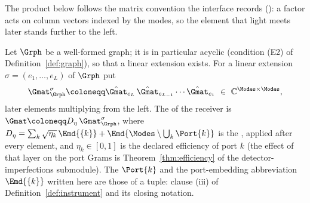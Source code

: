 
The product below follows the matrix convention the interface records
(): a factor acts on column
vectors indexed by the modes, so the element that light meets later stands
further to the left.

\begin{definition}\label{def:compile}
Let $\Grph$ be a well-formed graph; it is in particular acyclic
(condition (E2) of Definition~\ref{def:graph}), so that a linear extension exists. For a
linear extension $\sigma=(e_1,\dots,e_L)$ of $\Grph$ put
\begin{equation}\label{eq:compile}
  \Gmat_{\Grph}^{\sigma}\coloneqq
  \hat\Gmat_{e_L}\,\hat\Gmat_{e_{L-1}}\cdots\hat\Gmat_{e_1}
  \ \in\ \mathbb{C}^{\Modes\times\Modes},
\end{equation}
later elements multiplying from the left. The
 of the receiver is
$\Gmat\coloneqq D_\eta\,\Gmat^{\sigma}_{\Grph}$, where
$D_\eta=\sum_k\sqrt{\eta_k}\,\Emd{\{k\}}+\Emd{\Modes\setminus\bigcup_k
\Port{k}}$ is the , applied after every
element, and $\eta_k\in[0,1]$ is the declared efficiency of port $k$ (the
effect of that layer on the port Grams is Theorem~\ref{thm:efficiency} of the
detector-imperfections submodule). The  $\Port{k}$ and the
port-embedding abbreviation $\Emd{\{k\}}$ written here are those of a
 tuple: clause (iii) of
Definition~\ref{def:instrument} and its closing notation.
\end{definition}
